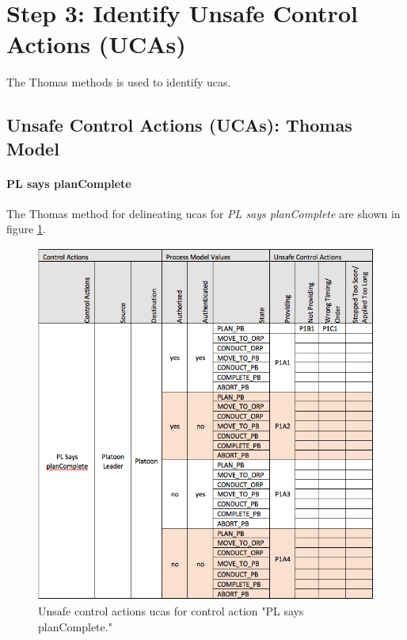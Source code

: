 \documentclass[../../main/main.tex]{subfiles}
\begin{document}
\clearpage

\section{Step 3: Identify Unsafe Control Actions (UCAs)}\label{chp:stpapb:uca}
The Thomas methods is used to identify \glspl{uca}.

\subsection{Unsafe Control Actions (UCAs): Thomas Model}
\clearpage
\paragraph*{PL says planComplete}
The Thomas method for delineating \glspl{uca} for \textit{PL says planComplete} are shown in figure \ref{UCAPLsays}.
\begin{figure}[ht!]
\begin{center}
\includegraphics[width=\linewidth]{../figures/UCAPLsays}
\caption{Unsafe control actions \glspl{uca} for control action "PL says planComplete."}
\label{UCAPLsays}
\end{center}
\end{figure}
\end{document}

